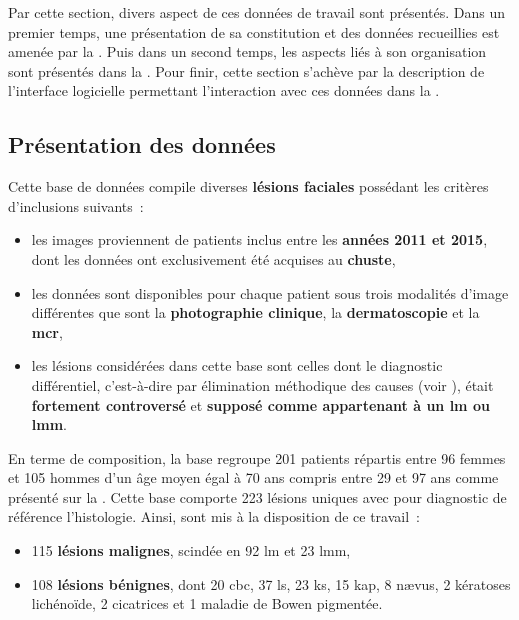 Par cette section, divers aspect de ces données de travail sont présentés. Dans un premier temps, une présentation de sa constitution et des données recueillies est amenée par la . Puis dans un second temps, les aspects liés à son organisation sont présentés dans la . Pour finir, cette section s'achève par la description de l'interface logicielle permettant l'interaction avec ces données dans la .

\subsection{Présentation des données}
\label{sec:dataset_introduction}
Cette base de données compile diverses \textbf{lésions faciales} possédant les critères d'inclusions suivants~:
\begin{itemize}
    \item les images proviennent de patients inclus entre les \textbf{années 2011 et 2015}, dont les données ont exclusivement été acquises au \textbf{\gls{chuste}},
    \item les données sont disponibles pour chaque patient sous trois modalités d'image différentes que sont la \textbf{photographie clinique}, la \textbf{dermatoscopie} et la \textbf{\gls{mcr}},
    \item les lésions considérées dans cette base sont celles dont le diagnostic différentiel, c’est-à-dire par élimination méthodique des causes (voir ), était \textbf{fortement controversé} et \textbf{supposé comme appartenant à un \gls{lm} ou \gls{lmm}}.
\end{itemize}\par

En terme de composition, la base regroupe 201 patients répartis entre 96 femmes et 105 hommes d'un âge moyen égal à 70 ans compris entre 29 et 97 ans comme présenté sur la . Cette base comporte 223 lésions uniques avec pour diagnostic de référence l'histologie. Ainsi, sont mis à la disposition de ce travail~:
\begin{itemize}
    \item 115 \textbf{lésions malignes}, scindée en 92 \gls{lm} et 23 \gls{lmm},
    \item 108 \textbf{lésions bénignes}, dont 20 \gls{cbc}, 37 \gls{ls}, 23 \gls{ks}, 15 \gls{kap}, 8 nævus, 2 kératoses lichénoïde, 2 cicatrices et 1 maladie de Bowen pigmentée.
\end{itemize}\par

